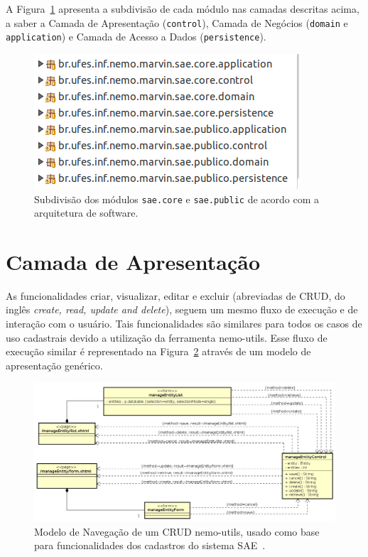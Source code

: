 A Figura~\ref{figura-modulos} apresenta a subdivisão de cada módulo nas camadas descritas acima, a saber a Camada de Apresentação (\texttt{control}), Camada de Negócios (\texttt{domain} e \texttt{application}) e Camada de Acesso a Dados (\texttt{persistence}).



\begin{figure}[h]
  \centering
  \includegraphics[scale=0.6]{figuras/modulos.png}
  \caption{Subdivisão dos módulos \texttt{sae.core} e \texttt{sae.public} de acordo com a arquitetura de software.}
  \label{figura-modulos}
\end{figure} 





\section{Camada de Apresentação}

As funcionalidades criar, visualizar, editar e excluir (abreviadas de CRUD, do inglês \textit{create, read, update and delete}), seguem um mesmo fluxo de execução e de interação com o usuário. Tais funcionalidades são similares para todos os casos de uso cadastrais devido a utilização da ferramenta nemo-utils. Esse fluxo de execução similar é representado na Figura~\ref{figura-modelo-view-crud} através de um modelo de apresentação genérico.

\begin{figure}[h]
  \centering
  \includegraphics[width=1\textwidth]{figuras/modelocrud}
  \caption{Modelo de Navegação de um CRUD nemo-utils, usado como base para funcionalidades dos cadastros do sistema SAE~\cite{lima-pg15}.}
  \label{figura-modelo-view-crud}
\end{figure} 


